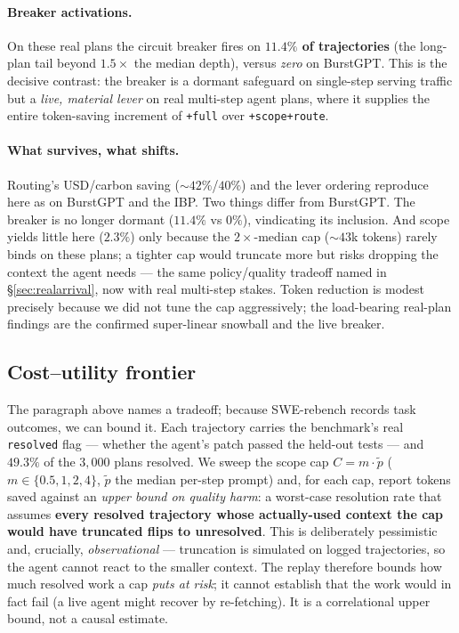 \documentclass[11pt]{article}
\theoremstyle{plain}
\theoremstyle{definition}
\theoremstyle{remark}
\begin{document}
\paragraph{Breaker activations.} On these real plans the circuit breaker fires on \textbf{$11.4\%$ of trajectories} (the long-plan tail beyond $1.5\times$ the median depth), versus \emph{zero} on BurstGPT. This is the decisive contrast: the breaker is a dormant safeguard on single-step serving traffic but a \emph{live, material lever} on real multi-step agent plans, where it supplies the entire token-saving increment of \texttt{+full} over \texttt{+scope+route}.

\paragraph{What survives, what shifts.} Routing's USD/carbon saving ($\sim$$42\%$/$40\%$) and the lever ordering reproduce here as on BurstGPT and the IBP. Two things differ from BurstGPT. The breaker is no longer dormant ($11.4\%$ vs $0\%$), vindicating its inclusion. And scope yields little here ($2.3\%$) only because the $2\times$-median cap ($\sim$$43$k tokens) rarely binds on these plans; a tighter cap would truncate more but risks dropping the context the agent needs --- the same policy/quality tradeoff named in \S\ref{sec:realarrival}, now with real multi-step stakes. Token reduction is modest precisely because we did not tune the cap aggressively; the load-bearing real-plan findings are the confirmed super-linear snowball and the live breaker.

\subsection{Cost--utility frontier}\label{sec:costutility}
The paragraph above names a tradeoff; because SWE-rebench records task outcomes, we can bound it. Each trajectory carries the benchmark's real \texttt{resolved} flag --- whether the agent's patch passed the held-out tests --- and $49.3\%$ of the $3{,}000$ plans resolved. We sweep the scope cap $C=m\cdot\tilde p$ ($m\in\{0.5,1,2,4\}$, $\tilde p$ the median per-step prompt) and, for each cap, report tokens saved against an \emph{upper bound on quality harm}: a worst-case resolution rate that assumes \textbf{every resolved trajectory whose actually-used context the cap would have truncated flips to unresolved}. This is deliberately pessimistic and, crucially, \emph{observational} --- truncation is simulated on logged trajectories, so the agent cannot react to the smaller context. The replay therefore bounds how much resolved work a cap \emph{puts at risk}; it cannot establish that the work would in fact fail (a live agent might recover by re-fetching). It is a correlational upper bound, not a causal estimate.
\end{document}
